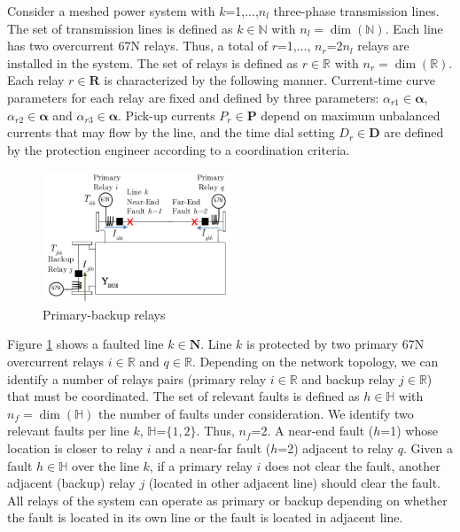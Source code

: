 \documentclass[letterpaper, 10 pt, conference]{IEEEtran}
\begin{document}
 Consider a meshed power system with $k$=1,...,$n_l$ three-phase transmission lines. The set of transmission lines is defined as $k\in \mathds{N}$ with $n_l=\dim{(\mathds{N})}$. Each line has two overcurrent 67N relays. Thus, a  total of $r$=1,$\ldots$, $n_r$=2$n_l$ relays are installed in the system. The set of relays is defined as $r\in \mathds{R}$ with $n_r=\dim{(\mathds{R})}$. Each relay  $r\in \mathbf{R}$ is characterized by the following manner. Current-time curve parameters for each relay are fixed and defined by three parameters: $\alpha_{r1}\in \bm {\alpha}$,  $\alpha_{r2}\in \bm {\alpha}$ and $\alpha_{r3}\in \bm {\alpha}$. Pick-up currents $P_r \in \bm {P}$
 depend on maximum unbalanced currents that may flow by the line, and  the time dial setting $D_r\in \bm {D}$ are defined by the protection engineer according to a coordination criteria.
\begin{figure}[t] \centerline{
     \includegraphics[width=2.3in]{images/main-backup.pdf}}
       \caption{Primary-backup relays}
      \label{main}
        \end{figure}

Figure \ref{main} shows a faulted line $k\in \mathbf{N}$. Line $k$ is protected by two primary  67N overcurrent relays $i\in \mathds{R}$ and $q\in \mathds{R}$. Depending on the network topology, we can identify a number of relays pairs (primary relay $i\in \mathds{R}$ and backup relay $j\in \mathds{R}$) that must be coordinated.
The set of relevant faults is defined as $h\in \mathds{H}$ with $n_f=\dim{(\mathds{H})}$ the number of faults under consideration. We identify two relevant faults per line $k$, $\mathds{H}$=$\{1,2\}$. Thus, $n_f$=2. A near-end fault ($h$=1) whose location is closer to relay $i$ and a near-far fault ($h$=2) adjacent to relay $q$. Given a fault $h\in \mathds{H}$ over the line $k$, if a primary relay $i$ does not clear the fault, another adjacent (backup) relay $j$ (located in other adjacent line) should clear the fault. All relays of the system can operate as primary or backup depending on whether the fault is located in its own line or the fault is located in adjacent line.
\end{document}

